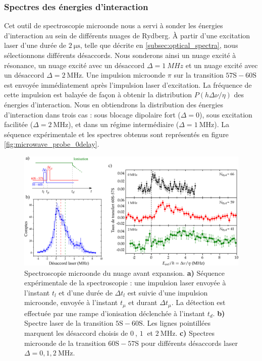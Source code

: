 	\subsubsection*{Spectres des énergies d'interaction}
\noindent Cet outil de spectroscopie microonde nous a servi à sonder les énergies d'interaction au sein de différents nuages de Rydberg.
\`A partir d'une excitation laser d'une durée de $\SI{2}{\us}$, telle que décrite en \ref{subsec:optical_spectra}, nous sélectionnons différents désaccords.
Nous sonderons ainsi un nuage excité à résonance, un nuage excité avec un désaccord $\Delta = \SI{1}{MHz}$ et un nuage excité avec un désaccord $\Delta = \SI{2}{\MHz}$.
Une impulsion microonde $\pi$ sur la transition $\mathrm{57S-60S}$ est envoyée immédiatement après l'impulsion laser d'excitation.
La fréquence de cette impulsion est balayée de façon à obtenir la distribution $P(h\Delta\nu/\eta)$ des énergies d'interaction.
Nous en obtiendrons la distribution des énergies d'interaction dans trois cas  : sous blocage dipolaire fort ($\Delta = 0$), sous excitation facilitée ($\Delta = \SI{2}{\MHz}$), et dans un régime intermédiaire ($\Delta = \SI{1}{\MHz}$).
La séquence expérimentale et les spectres obtenus sont représentés en figure \eqref{fig:microwave_probe_0delay}.
%
\begin{figure}[!h]
\centering
\includegraphics[width=\linewidth]{figures/low_l/microwave_probe_0delay_wide}
\caption[Spectroscopie microonde du nuage avec expansion]{
Spectroscopie microonde du nuage avant expansion.
\textbf{a)} Séquence expérimentale de la spectroscopie : une impulsion laser envoyée à l'instant $t_l$ et d'une durée de $\Delta t_l$ est suivie d'une impulsion microonde, envoyée à l'instant $t_\mu$ et durant $\Delta t_\mu$.
La détection est effectuée par une rampe d'ionisation déclenchée à l'instant $t_d$.
\textbf{b)} Spectre laser de la transition $\mathrm{5S-60S}$. Les lignes pointillées marquent les désaccord choisis de $\SI{0}{}$, $\SI{1}{}$ et $\SI{2}{\MHz}$.
\textbf{c)} Spectres microonde de la transition $\mathrm{60S-57S}$ pour différents désaccords laser $\Delta = 0, 1 , \SI{2}{\MHz}$.
}
\label{fig:microwave_probe_0delay}
\end{figure}
